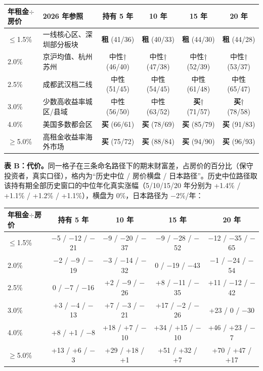 \documentclass[11pt,a4paper]{ctexart}
\begin{document}
\begin{table}[H]\centering\footnotesize
\setlength{\tabcolsep}{4pt}
\begin{tabular}{llcccc}
\toprule
年租金$\div$房价 & 2026 年参照 & 持有 5 年 & 10 年 & 15 年 & 20 年 \\
\midrule
$\leq$1.5\% & 一线核心区、深圳部分板块 & \textbf{租} (41/36) & \textbf{租} (40/33) & \textbf{租} (44/30) & \textbf{租} (44/28) \\
2.0\% & 京沪均值、杭州苏州 & 中性† (46/40) & 中性† (47/38) & 中性† (52/39) & 中性† (53/37) \\
2.5\% & 成都武汉档二线 & 中性 (51/45) & 中性 (54/45) & 中性 (61/48) & 中性 (65/47) \\
3.0\% & 少数高收益率城区/县域 & 中性 (56/50) & 中性 (63/52) & \textbf{买}† (71/57) & \textbf{买}† (78/58) \\
4.0\% & 美国多数都会区 & \textbf{买} (66/61) & \textbf{买} (78/69) & \textbf{买} (85/79) & \textbf{买} (91/83) \\
$\geq$5.0\% & 高租金收益率海外市场 & \textbf{买} (75/72) & \textbf{买} (88/84) & \textbf{买} (94/90) & \textbf{买} (96/93) \\
\bottomrule
\end{tabular}
\end{table}

\textbf{表 B：代价。}同一格子在三条命名路径下的期末财富差，占房价的百分比（保守投资者，真实口径），格内为``历史中位 / 房价横盘 / 日本路径''。历史中位路径取该持有期全部历史窗口的中位年化真实涨幅（5/10/15/20 年分别为 +1.4\% / +1.1\% / +1.2\% / +1.1\%），横盘为 0\%，日本路径为 $-$2\%/年：

\begin{table}[H]\centering\footnotesize
\begin{tabular}{lcccc}
\toprule
年租金$\div$房价 & 持有 5 年 & 10 年 & 15 年 & 20 年 \\
\midrule
$\leq$1.5\% & $-$5 / $-$12 / $-$21 & $-$9 / $-$20 / $-$37 & $-$9 / $-$28 / $-$52 & $-$12 / $-$35 / $-$65 \\
2.0\% & $-$2 / $-$9 / $-$19 & $-$3 / $-$14 / $-$32 & 0 / $-$19 / $-$43 & $-$1 / $-$24 / $-$54 \\
2.5\% & 0 / $-$7 / $-$16 & +2 / $-$9 / $-$26 & +8 / $-$11 / $-$35 & +11 / $-$12 / $-$42 \\
3.0\% & +3 / $-$4 / $-$13 & +7 / $-$3 / $-$21 & +17 / $-$2 / $-$26 & +23 / 0 / $-$30 \\
4.0\% & +8 / +1 / $-$8 & +18 / +7 / $-$10 & +34 / +15 / $-$10 & +46 / +23 / $-$7 \\
$\geq$5.0\% & +13 / +6 / $-$3 & +29 / +18 / +1 & +51 / +32 / +7 & +70 / +47 / +17 \\
\bottomrule
\end{tabular}
\end{table}
\end{document}
